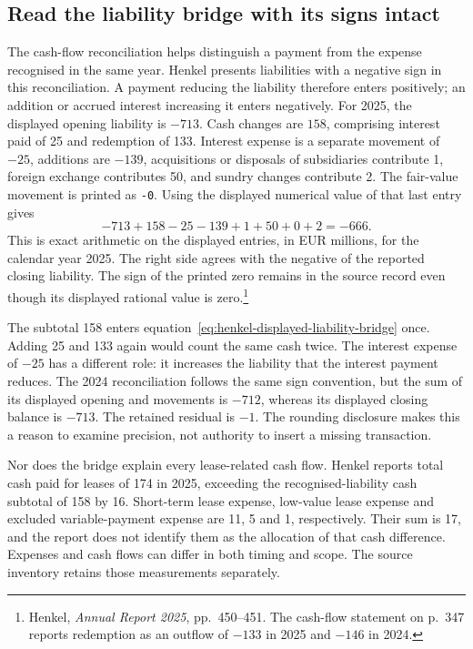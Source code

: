 \subsection{Read the liability bridge with its signs intact}

The cash-flow reconciliation helps distinguish a payment from the expense
recognised in the same year. Henkel presents liabilities with a negative sign
in this reconciliation. A payment reducing the liability therefore enters
positively; an addition or accrued interest increasing it enters negatively.
For 2025, the displayed opening liability is $-713$. Cash changes are $158$,
comprising interest paid of 25 and redemption of 133. Interest expense is a
separate movement of $-25$, additions are $-139$, acquisitions or disposals of
subsidiaries contribute 1, foreign exchange contributes 50, and sundry changes
contribute 2. The fair-value movement is printed as \texttt{-0}.
Using the displayed numerical value of that last entry gives
\begin{equation}
\label{eq:henkel-displayed-liability-bridge}
 -713+158-25-139+1+50+0+2=-666.
\end{equation}
This is exact arithmetic on the displayed entries, in EUR millions, for the
calendar year 2025. The right side agrees with the negative of the reported
closing liability. The sign of the printed zero remains in the source record
even though its displayed rational value is zero.\footnote{Henkel,
\emph{Annual Report 2025}, pp.~450--451. The cash-flow statement on p.~347
reports redemption as an outflow of $-133$ in 2025 and $-146$ in 2024.}

The subtotal 158 enters equation~\eqref{eq:henkel-displayed-liability-bridge}
once. Adding 25 and 133 again would count the same cash twice. The interest
expense of $-25$ has a different role: it increases the liability that the
interest payment reduces. The 2024 reconciliation follows the same sign
convention, but the sum of its displayed opening and movements is $-712$,
whereas its displayed closing balance is $-713$. The retained residual is
$-1$. The rounding disclosure makes this a reason to examine precision, not
authority to insert a missing transaction.

Nor does the bridge explain every lease-related cash flow. Henkel reports
total cash paid for leases of 174 in 2025, exceeding the recognised-liability
cash subtotal of 158 by 16. Short-term lease expense, low-value lease expense
and excluded variable-payment expense are 11, 5 and 1, respectively. Their
sum is 17, and the report does not identify them as the allocation of that cash
difference. Expenses and cash flows can differ in both timing and scope. The
source inventory retains those measurements separately.

